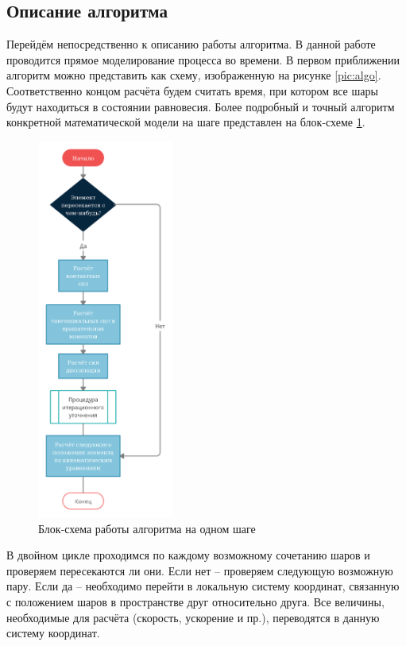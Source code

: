 \documentclass[utf8x, 14pt, oneside, a4paper]{article}
\begin{document}
\subsection{Описание алгоритма}

    
Перейдём непосредственно к описанию работы алгоритма.
В данной работе проводится прямое моделирование процесса во времени.
В первом приближении алгоритм можно представить как схему, изображенную на рисунке \ref{pic:algo}. 
Соответственно концом расчёта будем считать время, при котором все шары будут находиться в состоянии равновесия.
Более подробный и точный алгоритм конкретной математической модели на шаге представлен на блок-схеме \ref{pic:osn_block}.

\begin{figure}[h!]
	\centering
	\includegraphics[width=0.4\textwidth]{big_block}
	\caption{Блок-схема работы алгоритма на одном шаге}
	\label{pic:osn_block}
\end{figure} 

В двойном цикле проходимся по каждому возможному сочетанию шаров и проверяем пересекаются ли они.
Если нет -- проверяем следующую возможную пару.
Если да -- необходимо перейти в локальную систему координат, связанную с положением шаров в пространстве друг относительно друга. Все величины, необходимые для расчёта (скорость, ускорение и пр.), переводятся в данную систему координат.
\end{document}

